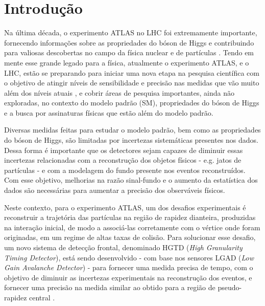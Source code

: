 \chapter{Introdução}

Na última década, o experimento ATLAS no LHC foi extremamente importante, fornecendo informações sobre as propriedades do bóson de Higgs e contribuindo para valiosas descobertas no campo da física nuclear e de partículas \cite{atlas_rev}. Tendo em mente esse grande legado para a física, atualmente o experimento ATLAS, e o LHC, estão se preparando para iniciar uma nova etapa na pesquisa científica com o objetivo de atingir níveis de sensibilidade e precisão nas medidas que vão muito além dos níveis atuais \cite{tdr}, e cobrir áreas de pesquisa importantes, ainda não exploradas, no contexto do modelo padrão (SM), propriedades do bóson de Higgs e a busca por assinaturas físicas que estão além do modelo padrão.

Diversas medidas feitas para estudar o modelo padrão, bem como as propriedades do bóson de Higgs, são limitadas por incertezas sistemáticas presentes nos dados. Dessa forma é importante que os detectores sejam capazes de diminuir essas incertezas relacionadas com a reconstrução dos objetos físicos - e.g. jatos de partículas - e com a modelagem do fundo presente nos eventos reconstruídos. Com esse objetivo, melhorias na razão sinal-fundo e o aumento da estatística dos dados são necessárias para aumentar a precisão dos observáveis físicos. %

Neste contexto, para o experimento ATLAS, um dos desafios experimentais é reconstruir a trajetória das partículas na região de rapidez dianteira, produzidas na interação inicial, de modo a associá-las corretamente com o vértice onde foram originadas, em um regime de altas taxas de colisão. Para solucionar esse desafio, um novo sistema de detecção frontal, denominado HGTD ({\it High Granularity Timing Detector}), está sendo desenvolvido - com base nos sensores LGAD ({\it Low Gain Avalanche Detector}) - para fornecer uma medida precisa de tempo, com o objetivo de diminuir as incertezas experimentais na reconstrução dos eventos, e fornecer uma precisão na medida similar ao obtido para a região de pseudo-rapidez central \cite{tdr}.

